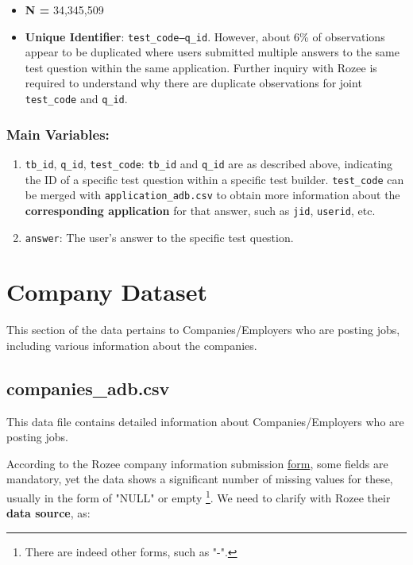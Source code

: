 \documentclass[12pt]{article}
\begin{document}
\begin{itemize}
    \item \textbf{N = }34,345,509
    \item \textbf{Unique Identifier}: \texttt{test\_code--q\_id}. However, about 6\% of observations appear to be duplicated where users submitted multiple answers to the same test question within the same application. Further inquiry with Rozee is required to understand why there are duplicate observations for joint \texttt{test\_code} and \texttt{q\_id}.
    
    \end{itemize}
 \subsubsection*{Main Variables:}
    \begin{enumerate}
        \item \texttt{tb\_id}, \texttt{q\_id}, \texttt{test\_code}: \texttt{tb\_id} and \texttt{q\_id} are as described above, indicating the ID of a specific test question within a specific test builder. \texttt{test\_code} can be merged with \texttt{application\_adb.csv} to obtain more information about the \textbf{corresponding application} for that answer, such as \texttt{jid}, \texttt{userid}, etc.
        \item \texttt{answer}: The user's answer to the specific test question.
    \end{enumerate}




\newpage
\section{Company Dataset}
\label{sec:company}
This section of the data pertains to Companies/Employers who are posting jobs, including various information about the companies.

\subsection{companies\_adb.csv}
This data file contains detailed information about Companies/Employers who are posting jobs. 

According to the Rozee company information submission \href{https://hiring.rozee.pk/companies/addcompany}{form}, some fields are mandatory, yet the data shows a significant number of missing values for these, usually in the form of "NULL" or empty \footnote{There are indeed other forms, such as "-".}. We need to clarify with Rozee their \textbf{data source}, as: 
\end{document}
